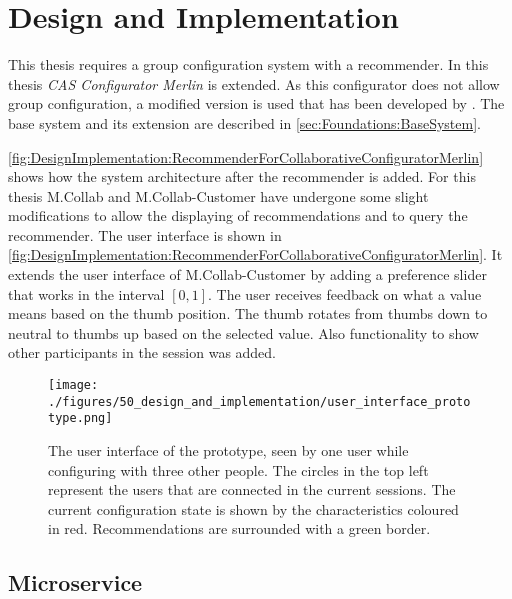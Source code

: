 \chapter{Design and Implementation}
\label{ch:DesignImplementation}

This thesis requires a group configuration system with a recommender. In this thesis \emph{CAS Configurator Merlin} \cite{IndustrySpecificProduct2020} is extended. As this configurator does not allow group configuration, a modified version is used that has been developed by \citeauthor{raabKollaborativeProduktkonfigurationEchtzeit2019} \cite{raabKollaborativeProduktkonfigurationEchtzeit2019}. The base system and its extension are described in \autoref{sec:Foundations:BaseSystem}.

\autoref{fig:DesignImplementation:RecommenderForCollaborativeConfiguratorMerlin} shows how the system architecture after the recommender is added. For this thesis M.Collab and M.Collab-Customer have undergone some slight modifications to allow the displaying of recommendations and to query the recommender. The user interface is shown in \autoref{fig:DesignImplementation:RecommenderForCollaborativeConfiguratorMerlin}. It extends the user interface of M.Collab-Customer by adding a preference slider that works in the interval $[0,1]$. The user receives feedback on what a value means based on the thumb position. The thumb rotates from thumbs down to neutral to thumbs up based on the selected value. Also functionality to show other participants in the session was added.

\begin{figure}
    \centering
    \texttt{[image: ./figures/50\_design\_and\_implementation/user\_interface\_prototype.png]}
    \caption{The user interface of the prototype, seen by one user while configuring with three other people. The circles in the top left represent the users that are connected in the current sessions. The current configuration state is shown by the characteristics coloured in red. Recommendations are surrounded with a green border.}
    \label{fig:DesignImplementation:UserInterface}
\end{figure}


\section{Microservice}
\label{sec:DesignImplementation:Microservice}

